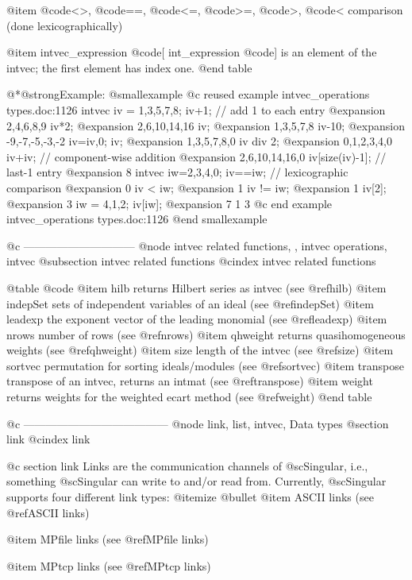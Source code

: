 {{{{{{@item  @code{<>}, @code{==}, @code{<=}, @code{>=}, @code{>}, @code{<}
comparison (done lexicographically)

@item intvec_expression @code{[} int_expression @code{]}
is an element of the intvec; the first element has index one.
@end table

@*@strong{Example:}
@smallexample
@c reused example intvec_operations types.doc:1126 
  intvec iv =  1,3,5,7,8;
  iv+1;               // add 1 to each entry
@expansion{} 2,4,6,8,9
  iv*2;
@expansion{} 2,6,10,14,16
  iv;
@expansion{} 1,3,5,7,8
  iv-10;
@expansion{} -9,-7,-5,-3,-2
  iv=iv,0;
  iv;
@expansion{} 1,3,5,7,8,0
  iv div 2;
@expansion{} 0,1,2,3,4,0
  iv+iv;              // component-wise addition
@expansion{} 2,6,10,14,16,0
  iv[size(iv)-1];     // last-1 entry
@expansion{} 8
  intvec iw=2,3,4,0;
  iv==iw;             // lexicographic comparison
@expansion{} 0
  iv < iw;
@expansion{} 1
  iv != iw;
@expansion{} 1
  iv[2];
@expansion{} 3
  iw = 4,1,2;
  iv[iw];
@expansion{} 7 1 3
@c end example intvec_operations types.doc:1126
@end smallexample

@c ------------------------------
@node intvec related functions,  , intvec operations, intvec
@subsection intvec related functions
@cindex intvec related functions

@table @code
@item hilb
returns Hilbert series as intvec (see @ref{hilb})
@item indepSet
sets of independent variables of an ideal (see @ref{indepSet})
@item leadexp
the exponent vector of the leading monomial (see @ref{leadexp})
@item nrows
number of rows (see @ref{nrows})
@item qhweight
returns quasihomogeneous weights (see @ref{qhweight})
@item size
length of the intvec (see @ref{size})
@item sortvec
permutation for sorting ideals/modules (see @ref{sortvec})
@item transpose
transpose of an intvec, returns an intmat (see @ref{transpose})
@item weight
returns weights for the weighted ecart method (see @ref{weight})
@end table

@c ---------------------------------------
@node link, list, intvec, Data types
@section link
@cindex link

@c {{{ section link }}}
Links are the communication channels of @sc{Singular}, i.e.,
something @sc{Singular} can write to and/or read from. Currently,
@sc{Singular} supports four different link types:
@itemize @bullet
@item ASCII links (see
@ref{ASCII links})

@item MPfile links (see
@ref{MPfile links})

@item MPtcp links (see
@ref{MPtcp links})

}}}}}}
